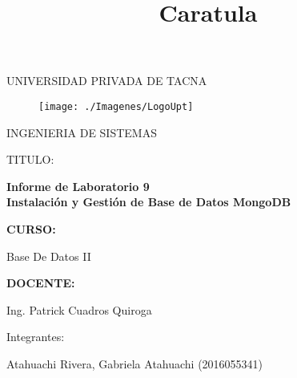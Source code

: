 \documentclass[12pt, letterpaper]{article}
\begin{document}
\title{Caratula}

\begin{titlepage}
	\begin{center}
		\large{UNIVERSIDAD PRIVADA DE TACNA}\\

		\vspace*{-0.025in}
			\begin{figure}[htb]
				\begin{center}
					\texttt{[image: ./Imagenes/LogoUpt]}
				\end{center}
			\end{figure}

		\vspace*{0.15in}
		INGENIERIA DE SISTEMAS  \\

		\vspace*{0.5in}
			\begin{large}
			TITULO:\\
			\end{large}

		\vspace*{0.1in}
			\begin{large}
				\textbf{Informe de Laboratorio 9} \\
				\textbf{Instalación y Gestión de Base de Datos MongoDB} \\
			\end{large}

		\vspace*{0.3in}
			\begin{large}
				\textbf{CURSO:} \\
			\end{large}

		\vspace*{0.1in}
			\begin{large}
				Base De Datos II \\
			\end{large}

		\vspace*{0.3in}
			\begin{large}
				\textbf{DOCENTE:} \\
			\end{large}

		\vspace*{0.1in}
			\begin{large}
				Ing. Patrick Cuadros Quiroga \\
			\end{large}

		\vspace*{0.2in}
			\vspace*{0.1in}
				\begin{large}
					Integrantes: \\
					\begin{flushleft}
						Atahuachi Rivera, Gabriela Atahuachi	\hfill	(2016055341) \\
					\end{flushleft}
				\end{large}
	\end{center}
\end{titlepage}

\tableofcontents %
	\thispagestyle{empty} %
		\newpage
			\setcounter{page}{1} %
				
				
\end{document}
